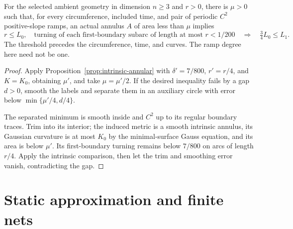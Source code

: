 \begin{lemma}
\label{lem:annular-ramp-comparison}
For the selected ambient geometry in dimension $n\geq3$ and
$r>0$, there is $\mu>0$ such that, for every circumference,
included time, and pair of periodic $C^2$ positive-slope ramps,
an actual annulus $A$ of area less than $\mu$ implies
\begin{equation}
 r\leq L_0,\quad
 \text{turning of each first-boundary subarc of length at most }r<1/200
 \quad\Longrightarrow\quad
 \tfrac34L_0\leq L_1.
 \label{eq:ramp-comparison}
\end{equation}
The threshold precedes the circumference, time, and curves.
The ramp degree here need not be one.
\end{lemma}
\begin{proof}
Apply Proposition~\ref{prop:intrinsic-annular} with
$\delta'=7/800$, $r'=r/4$, and $K=K_0$, obtaining $\mu'$,
and take $\mu=\mu'/2$. If the desired inequality fails by a
gap $d>0$, smooth the labels and separate them in an auxiliary
circle with error below $\min\{\mu'/4,d/4\}$.

The separated minimum is smooth inside and $C^2$ up to its
regular boundary traces. Trim into its interior; the induced
metric is a smooth intrinsic annulus, its Gaussian curvature
is at most $K_0$ by the minimal-surface Gauss equation, and its
area is below $\mu'$. Its first-boundary turning remains below
$7/800$ on arcs of length $r/4$. Apply the intrinsic comparison,
then let the trim and smoothing error vanish, contradicting the gap.
\end{proof}

\section{Static approximation and finite nets}
\label{sec:static-approximation}

